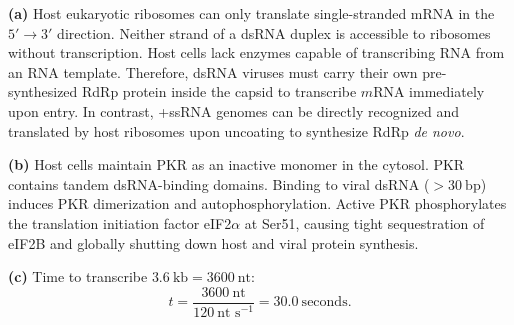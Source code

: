 \documentclass[12pt, a4paper, oneside]{report}
\begin{document}

\begin{solution}
  \textbf{(a)} Host eukaryotic ribosomes can only translate single-stranded mRNA in the $5'\to 3'$ direction. Neither strand of a dsRNA duplex is accessible to ribosomes without transcription. Host cells lack enzymes capable of transcribing RNA from an RNA template. Therefore, dsRNA viruses must carry their own pre-synthesized RdRp protein inside the capsid to transcribe $m\mathrm{RNA}$ immediately upon entry. In contrast, +ssRNA genomes can be directly recognized and translated by host ribosomes upon uncoating to synthesize RdRp \textit{de novo}.

  \textbf{(b)} Host cells maintain PKR as an inactive monomer in the cytosol. PKR contains tandem dsRNA-binding domains. Binding to viral dsRNA ($> 30~\text{bp}$) induces PKR dimerization and autophosphorylation. Active PKR phosphorylates the translation initiation factor eIF2$\alpha$ at Ser51, causing tight sequestration of eIF2B and globally shutting down host and viral protein synthesis.

  \textbf{(c)} Time to transcribe $3.6~\text{kb} = 3600~\text{nt}$:
  \[
    t = \frac{3600~\text{nt}}{120~\text{nt~s}^{-1}} = 30.0~\text{seconds}.
  \]
\end{solution}
\end{document}
